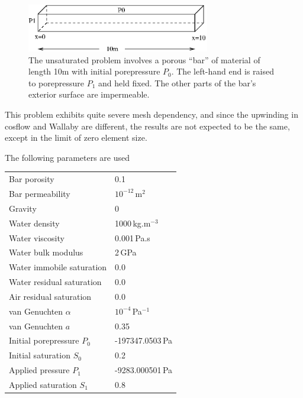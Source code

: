 \documentclass[]{scrreprt}
\begin{document}
\begin{figure}[htb]
\begin{center}
\includegraphics[width=8cm]{uf_setup.eps}
\caption{The unsaturated problem involves a porous
  ``bar'' of material of length 10m with initial porepressure
  $P_{0}$.  The left-hand end is raised to porepressure $P_{1}$ and
  held fixed.  The other parts of the bar's exterior surface are impermeable.}
\label{uf_setup.fig}
\end{center}
\end{figure}

This problem exhibits quite severe mesh dependency, and since the
upwinding in cosflow and Wallaby are different, the results are not
expected to be the same, except in the limit of zero element size.

\noindent The following parameters are used \\
\begin{center}
\begin{tabular}{|ll|}
\hline
Bar porosity & 0.1 \\
Bar permeability & $10^{-12}$\,m$^{2}$ \\
\hline
Gravity & 0 \\
\hline
Water density & 1000\,kg.m$^{-3}$ \\
Water viscosity & 0.001\,Pa.s \\
Water bulk modulus & 2\,GPa \\
Water immobile saturation & 0.0 \\
Water residual saturation & 0.0 \\
Air residual saturation & 0.0 \\
\hline
van Genuchten $\alpha$ & $10^{-4}$\,Pa$^{-1}$ \\
van Genuchten $a$ & 0.35 \\
\hline
Initial porepressure $P_{0}$ & -197347.0503\,Pa \\
Initial saturation $S_{0}$ & 0.2 \\
Applied pressure $P_{1}$ & -9283.000501\,Pa \\
Applied saturation $S_{1}$ & 0.8 \\
\hline
\end{tabular} \\
\end{center}
\end{document}
